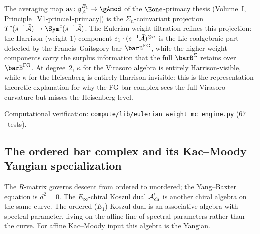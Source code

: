 \begin{remark}
The averaging map $\mathrm{av}\colon \mathfrak{g}_\cA^{E_1} \to \gAmod$ of
the $\Eone$-primacy thesis
(Volume~I, Principle~\textup{\ref*{V1-princ:e1-primacy}})
is the $\Sigma_n$-coinvariant projection
$T^c(s^{-1}\bar\cA) \to \Sym^c(s^{-1}\bar\cA)$.
The Eulerian weight filtration refines this projection:
the Harrison (weight-$1$) component
$e_1 \cdot (s^{-1}\bar{\mathcal{A}})^{\otimes n}$ is the Lie-coalgebraic
part detected by the Francis--Gaitsgory bar $\barB^{\mathrm{FG}}$,
while the higher-weight components carry the surplus information
that the full $\barB^{\Sigma}$ retains over $\barB^{\mathrm{FG}}$.
At degree~$2$, $\kappa$ for the Virasoro algebra is entirely
Harrison-visible, while $\kappa$ for the Heisenberg is entirely
Harrison-invisible: this is the representation-theoretic
explanation for why the FG bar complex sees the full Virasoro
curvature but misses the Heisenberg level.

Computational verification:
\texttt{compute/lib/eulerian\_weight\_mc\_engine.py}
($67$~tests).
\end{remark}

\subsection{The ordered bar complex and its Kac--Moody Yangian specialization}
\label{subsec:dg-shifted-yangian-from-bar}

The $R$-matrix governs descent from ordered to unordered; the
Yang--Baxter equation is $d^2=0$. The $E_\infty$-chiral Koszul dual
$\mathcal{A}^!_{\mathrm{ch}}$ is another chiral algebra on the same curve.
The ordered ($E_1$) Koszul dual is an associative algebra with
spectral parameter, living on the affine line of spectral
parameters rather than the curve. For affine Kac--Moody input this
algebra is the Yangian.


